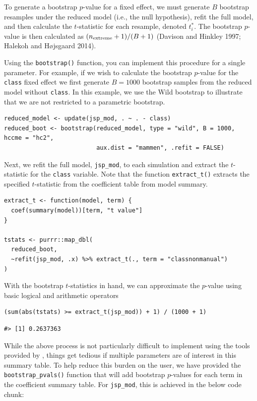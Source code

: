 To generate a bootstrap \(p\)-value for a fixed effect, we must generate \(B\) bootstrap resamples under the reduced model (i.e., the null hypothesis), refit the full model, and then calculate the \(t\)-statistic for each resample, denoted \(t^*_i\). The bootstrap \(p\)-value is then calculated as \((n_{\rm extreme} + 1) / (B + 1)\) (Davison and Hinkley 1997; Halekoh and Højsgaard 2014).

Using the \texttt{bootstrap()} function, you can implement this procedure for a single parameter. For example, if we wish to calculate the bootstrap \(p\)-value for the \texttt{class} fixed effect we first generate \(B=1000\) bootstrap samples from the reduced model without \texttt{class}. In this example, we use the Wild bootstrap to illustrate that we are not restricted to a parametric bootstrap.

\begin{verbatim}
reduced_model <- update(jsp_mod, . ~ . - class)
reduced_boot <- bootstrap(reduced_model, type = "wild", B = 1000, hccme = "hc2", 
                          aux.dist = "mammen", .refit = FALSE)
\end{verbatim}

\noindent Next, we refit the full model, \texttt{jsp\_mod}, to each simulation and extract the \(t\)-statistic for the \texttt{class} variable. Note that the function \texttt{extract\_t()} extracts the specified \(t\)-statistic from the coefficient table from model summary.

\begin{verbatim}
extract_t <- function(model, term) {
  coef(summary(model))[term, "t value"]
}

tstats <- purrr::map_dbl(
  reduced_boot, 
  ~refit(jsp_mod, .x) %>% extract_t(., term = "classnonmanual")
)
\end{verbatim}

\noindent With the bootstrap \(t\)-statistics in hand, we can approximate the \(p\)-value using basic logical and arithmetic operators

\begin{verbatim}
(sum(abs(tstats) >= extract_t(jsp_mod)) + 1) / (1000 + 1)
\end{verbatim}

\begin{verbatim}
#> [1] 0.2637363
\end{verbatim}

While the above process is not particularly difficult to implement using the tools provided by , things get tedious if multiple parameters are of interest in this summary table. To help reduce this burden on the user, we have provided the \texttt{bootstrap\_pvals()} function that will add bootstrap \(p\)-values for each term in the coefficient summary table. For \texttt{jsp\_mod}, this is achieved in the below code chunk:

